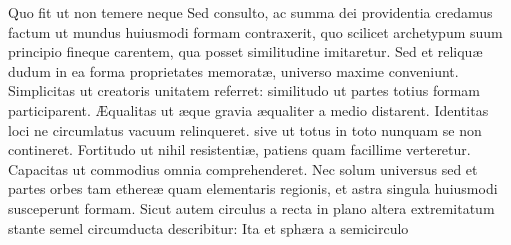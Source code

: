\documentclass[11pt,a4paper]{article}
\begin{document}
Quo fit ut non temere neque Sed consulto, ac summa dei providentia credamus factum ut mundus huiusmodi formam contraxerit, quo scilicet archetypum suum principio fineque carentem, qua posset similitudine imitaretur.
Sed et reliquæ dudum in ea forma proprietates memoratæ, universo maxime conveniunt. Simplicitas ut creatoris unitatem referret: similitudo ut partes totius formam participarent. Æqualitas ut æque gravia æqualiter a medio distarent. Identitas loci ne circumlatus vacuum relinqueret. sive ut totus in toto nunquam se non contineret. Fortitudo ut nihil resistentiæ, patiens quam facillime verteretur. Capacitas ut commodius omnia comprehenderet. Nec solum universus sed et partes orbes tam ethereæ quam elementaris regionis, et astra singula huiusmodi susceperunt formam. Sicut autem circulus a recta in plano altera extremitatum stante semel circumducta describitur: Ita et sphæra a semicirculo
\end{document}
